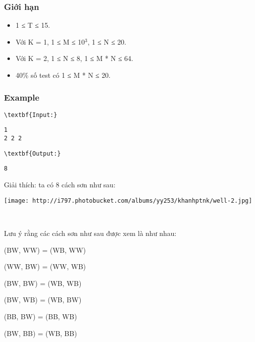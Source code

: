 \subsubsection{Giới hạn}
\begin{itemize}
	\item 1 ≤ T ≤ 15.
	\item Với K = 1, 1 ≤ M ≤ 10$^3$, 1 ≤ N ≤ 20. 
	\item Với K = 2, 1 ≤ N ≤ 8, 1 ≤ M * N ≤ 64.
	\item 40\% số test có 1 ≤ M * N ≤ 20.
\end{itemize}

\subsubsection{Example}
\begin{verbatim}
\textbf{Input:}\end{verbatim}
\begin{verbatim}
1
2 2 2\end{verbatim}
\begin{verbatim}
\textbf{Output:}\end{verbatim}
\begin{verbatim}
8\end{verbatim}

Giải thích: ta có 8 cách sơn như sau:


\texttt{[image: http://i797.photobucket.com/albums/yy253/khanhptnk/well-2.jpg]}

 

Lưu ý rằng các cách sơn như sau được xem là như nhau:

(BW, WW) = (WB, WW)

(WW, BW) = (WW, WB)

(BW, BW) = (WB, WB)

(BW, WB) = (WB, BW)

(BB, BW) = (BB, WB)

(BW, BB) = (WB, BB)
